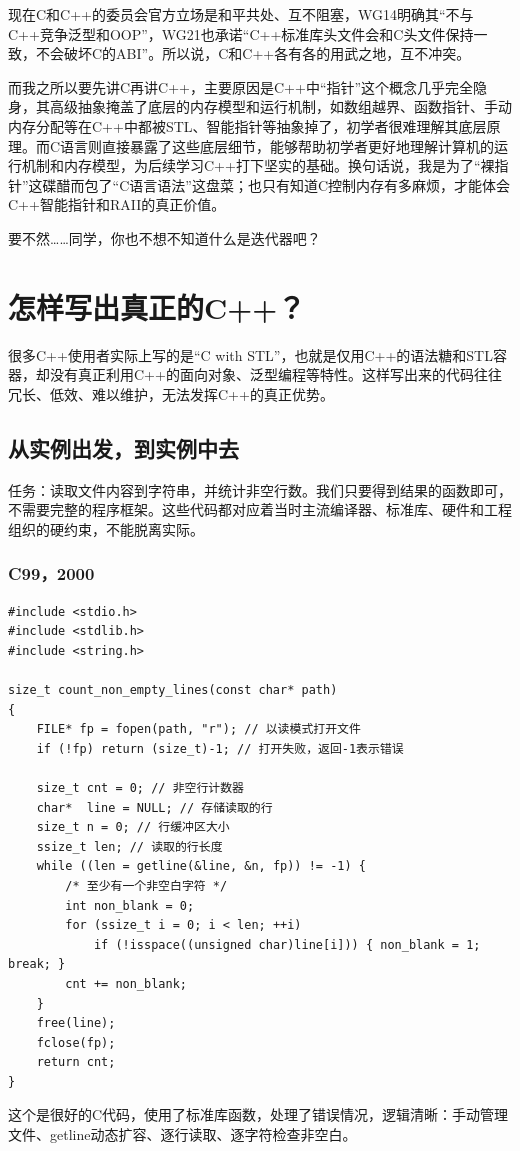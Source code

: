 现在C和C++的委员会官方立场是和平共处、互不阻塞，WG14明确其“不与C++竞争泛型和OOP”，WG21也承诺“C++标准库头文件会和C头文件保持一致，不会破坏C的ABI”。所以说，C和C++各有各的用武之地，互不冲突。

而我之所以要先讲C再讲C++，主要原因是C++中“指针”这个概念几乎完全隐身，其高级抽象掩盖了底层的内存模型和运行机制，如数组越界、函数指针、手动内存分配等在C++中都被STL、智能指针等抽象掉了，初学者很难理解其底层原理。而C语言则直接暴露了这些底层细节，能够帮助初学者更好地理解计算机的运行机制和内存模型，为后续学习C++打下坚实的基础。换句话说，我是为了“裸指针”这碟醋而包了“C语言语法”这盘菜；也只有知道C控制内存有多麻烦，才能体会C++智能指针和RAII的真正价值。

要不然……同学，你也不想不知道什么是迭代器吧？

\section{怎样写出真正的C++？}

很多C++使用者实际上写的是“C with STL”，也就是仅用C++的语法糖和STL容器，却没有真正利用C++的面向对象、泛型编程等特性。这样写出来的代码往往冗长、低效、难以维护，无法发挥C++的真正优势。

\subsection{从实例出发，到实例中去}

任务：读取文件内容到字符串，并统计非空行数。我们只要得到结果的函数即可，不需要完整的程序框架。这些代码都对应着当时主流编译器、标准库、硬件和工程组织的硬约束，不能脱离实际。

\subsubsection{C99，2000}
\begin{verbatim}
#include <stdio.h>
#include <stdlib.h>
#include <string.h>

size_t count_non_empty_lines(const char* path)
{
    FILE* fp = fopen(path, "r"); // 以读模式打开文件
    if (!fp) return (size_t)-1; // 打开失败，返回-1表示错误

    size_t cnt = 0; // 非空行计数器
    char*  line = NULL; // 存储读取的行
    size_t n = 0; // 行缓冲区大小
    ssize_t len; // 读取的行长度
    while ((len = getline(&line, &n, fp)) != -1) {
        /* 至少有一个非空白字符 */
        int non_blank = 0;
        for (ssize_t i = 0; i < len; ++i)
            if (!isspace((unsigned char)line[i])) { non_blank = 1; break; }
        cnt += non_blank;
    }
    free(line);
    fclose(fp);
    return cnt;
}
\end{verbatim}
这个是很好的C代码，使用了标准库函数，处理了错误情况，逻辑清晰：手动管理文件、getline动态扩容、逐行读取、逐字符检查非空白。

